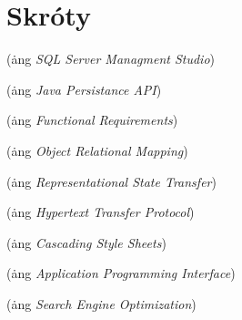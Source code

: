 % 
\chapter*{Skróty}
\label{sec:skroty}
\noindent\vspace{-\topsep-\partopsep-\parsep} %
\begin{description}[labelwidth=*]
  \item [SSMS] (\.ang \emph{SQL Server Managment Studio})
	\item [JPA] (\.ang \emph{Java Persistance API})
	\item [FR] (\.ang \emph{Functional Requirements})
	\item [ORM] (\.ang \emph{Object Relational Mapping})
	\item [REST] (\.ang \emph{Representational State Transfer})
	\item [HTTP] (\.ang \emph{Hypertext Transfer Protocol})
	\item [CSS] (\.ang \emph{Cascading Style Sheets})
	\item [API] (\.ang \emph{Application Programming Interface})
	\item [SEO] (\.ang \emph{Search Engine Optimization})
\end{description}
